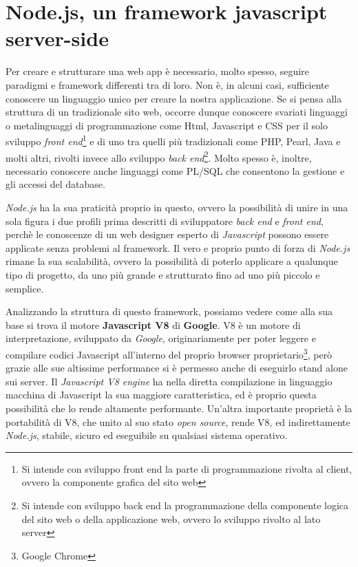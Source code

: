 \section{Node.js, un framework javascript server-side}

Per creare e strutturare una web app è necessario, molto spesso, seguire paradigmi e framework differenti tra di loro. Non è, in alcuni casi, sufficiente conoscere un linguaggio unico per creare la nostra applicazione. Se si pensa alla struttura di un tradizionale sito web, occorre dunque conoscere svariati linguaggi o metalinguaggi di programmazione come Html, Javascript e CSS per il solo sviluppo \textit{front end}\footnote{Si intende con sviluppo front end la parte di programmazione rivolta al client, ovvero la componente grafica del sito web} e di uno tra quelli più tradizionali come PHP, Pearl, Java e molti altri, rivolti invece allo sviluppo \textit{back end}\footnote{Si intende con sviluppo back end la programmazione della componente logica del sito web o della applicazione web, ovvero lo sviluppo rivolto al lato server}. Molto spesso è, inoltre, necessario conoscere anche linguaggi come PL/SQL che consentono la gestione e gli accessi del database.

\textit{Node.js} ha la sua praticità proprio in questo, ovvero la possibilità di unire in una sola figura i due profili prima descritti di sviluppatore \textit{back end} e \textit{front end}, perchè le conoscenze di un web designer esperto di \textit{Javascript} possono essere applicate senza problemi al framework. Il vero e proprio punto di forza di \textit{Node.js} rimane la sua scalabilità, ovvero la possibilità di poterlo applicare a qualunque tipo di progetto, da uno più grande e strutturato fino ad uno più piccolo e semplice. 

Analizzando la struttura di questo framework, possiamo vedere come alla sua base si trova il motore \textbf{Javascript V8} di \textbf{Google}. V8 è un motore di interpretazione, sviluppato da \textit{Google}, originariamente per poter leggere e compilare codici Javascript all'interno del proprio browser proprietario\footnote{Google Chrome}, però grazie alle sue altissime performance si è permesso anche di eseguirlo stand alone sui server. Il \textit{Javascript V8 engine} ha nella diretta compilazione in linguaggio macchina di Javascript la sua maggiore caratteristica, ed è proprio questa possibilità che lo rende altamente performante. Un'altra importante proprietà è la portabilità di V8, che unito al suo stato \textit{open source}, rende V8, ed indirettamente \textit{Node.js}, stabile, sicuro ed eseguibile su qualsiasi sistema operativo.

